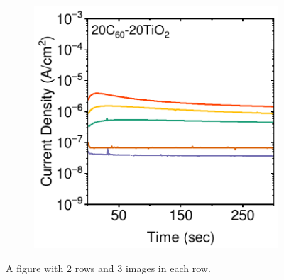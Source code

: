 \begin{figure}[htbp]
\begin{subfigure}[b]{0.32\textwidth}
        \caption{}
    \end{subfigure}
    \hfill
    \begin{subfigure}[b]{0.32\textwidth}
        \centering
        \includegraphics[width=\textwidth]{chapters/transport_layers/images/StaticJV_20_20.pdf}
        \caption{}
    \end{subfigure}

    \caption{A figure with 2 rows and 3 images in each row.}
    \label{fig:dicrete_and_static_jvs}
\end{figure}




